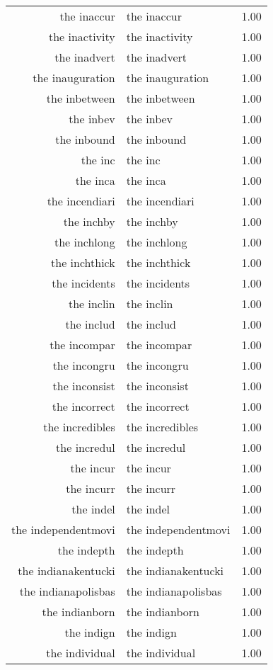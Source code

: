 \begin{table}[ht]
\begin{tabular}{rlr}
  the inaccur & the inaccur & 1.00 \\ 
  the inactivity & the inactivity & 1.00 \\ 
  the inadvert & the inadvert & 1.00 \\ 
  the inauguration & the inauguration & 1.00 \\ 
  the inbetween & the inbetween & 1.00 \\ 
  the inbev & the inbev & 1.00 \\ 
  the inbound & the inbound & 1.00 \\ 
  the inc & the inc & 1.00 \\ 
  the inca & the inca & 1.00 \\ 
  the incendiari & the incendiari & 1.00 \\ 
  the inchby & the inchby & 1.00 \\ 
  the inchlong & the inchlong & 1.00 \\ 
  the inchthick & the inchthick & 1.00 \\ 
  the incidents & the incidents & 1.00 \\ 
  the inclin & the inclin & 1.00 \\ 
  the includ & the includ & 1.00 \\ 
  the incompar & the incompar & 1.00 \\ 
  the incongru & the incongru & 1.00 \\ 
  the inconsist & the inconsist & 1.00 \\ 
  the incorrect & the incorrect & 1.00 \\ 
  the incredibles & the incredibles & 1.00 \\ 
  the incredul & the incredul & 1.00 \\ 
  the incur & the incur & 1.00 \\ 
  the incurr & the incurr & 1.00 \\ 
  the indel & the indel & 1.00 \\ 
  the independentmovi & the independentmovi & 1.00 \\ 
  the indepth & the indepth & 1.00 \\ 
  the indianakentucki & the indianakentucki & 1.00 \\ 
  the indianapolisbas & the indianapolisbas & 1.00 \\ 
  the indianborn & the indianborn & 1.00 \\ 
  the indign & the indign & 1.00 \\ 
  the individual & the individual & 1.00 \\ 

\end{tabular}
\end{table}
